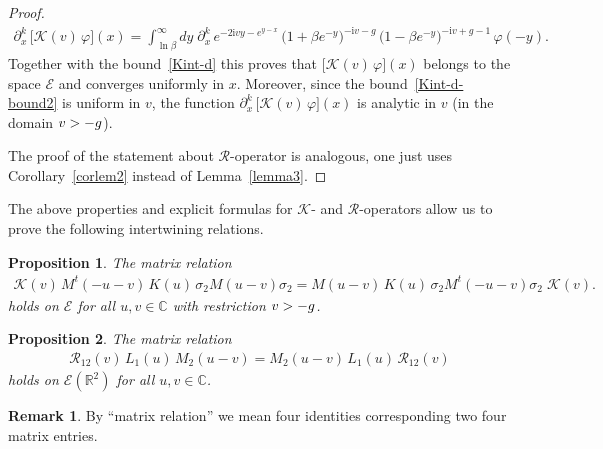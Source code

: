 \documentclass[11pt]{article}
\numberwithin{equation}{section}
\theoremstyle{plain}
\newtheorem{proposition}{Proposition}
\theoremstyle{definition}
\newtheorem{remark}{Remark}
\let\Im\relax
\DeclareMathOperator{\Im}{Im}
\renewcommand{\phi}{\varphi}
\renewcommand{\imath}{\mathrm{i}}
\begin{document}
\begin{proof}
	\begin{align}
		\partial_x^k \, \bigl[ \mathcal{K}(v) \, \phi](x) = \int_{\ln\beta}^\infty dy \; \partial_x^k \, e^{-2 \imath v y - e^{y -x} } \, \bigl(1 + \beta e^{-y}\bigr)^{- \imath v - g } \, \bigl(1 - \beta e^{-y}\bigr)^{- \imath v + g - 1} \, \phi( - y).
	\end{align}
	Together with the bound~\eqref{Kint-d} this proves that $\bigl[\mathcal{K}(v)\,\phi \bigr](x)$ belongs to the space $\mathcal{E}$ and converges uniformly in $x$. Moreover, since the bound~\eqref{Kint-d-bound2} is uniform in $v$, the function $\partial_x^k \, \bigl[ \mathcal{K}(v) \, \phi](x)$ is analytic in $v$ (in the domain $\Im v > -g$). 
	
	The proof of the statement about $\mathcal{R}$-operator is analogous, one just uses Corollary~\ref{corlem2} instead of Lemma~\ref{lemma3}.
\end{proof}

The above properties and explicit formulas for $\mathcal{K}$- and $\mathcal{R}$-operators allow us to prove the following intertwining relations.

\begin{proposition} \label{prop:KMKM}
	The matrix relation
	\begin{align}\label{KMKM2}
		\mathcal{K}(v) \, M^t(-u-v) \, K(u) \, \sigma_2 M(u - v) \sigma_2
		= M(u - v) \, K(u) \, \sigma_2 M^t(-u -v) \sigma_2 \; \mathcal{K}(v).
	\end{align}
	holds on $\mathcal{E}$ for all $u, v \in \mathbb{C}$ with restriction $\Im v > -g$.
\end{proposition}

\begin{proposition} \label{prop:RLM}
	The matrix relation
	\begin{align} \label{RLM2}
		\mathcal{R}_{12}(v) \, L_1(u) \, M_2(u - v) = M_2(u - v) \, L_1(u) \, \mathcal{R}_{12}( v)
	\end{align}
	holds on $\mathcal{E}(\mathbb{R}^2)$ for all $u, v \in \mathbb{C}$.
\end{proposition}

\begin{remark}
	By ``matrix relation'' we mean four identities corresponding two four matrix entries. 
\end{remark}
\end{document}
